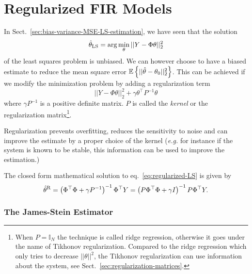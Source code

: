 \chapter{Regularized FIR Models}
\label{chap:regularised-FIR-models}

In Sect.~\ref{sec:bias-variance-MSE-LS-estimation}, we have seen that the solution
\begin{equation*}
  \hat{\theta}_\textrm{LS} = \arg\min_\theta ||Y-\Phi \theta||_2^2
\end{equation*}
of the least squares problem is unbiased. We can however choose to have a biased estimate to reduce the mean square error $\mathbb{E}\left\{||\hat{\theta}-\theta_0||_2^2\right\}$. This can be achieved if we modify the minimization problem by adding a regularization term
\begin{equation}
  \label{eq:regularized-LS}
  ||Y-\Phi \theta||_2^2 + \gamma \theta^\top P^{-1}\theta
\end{equation}
where $\gamma P^{-1}$ is a positive definite matrix. $P$ is called the \emph{kernel} or the regularization matrix\footnote{When $P=\mathbb{I}_N$ the technique is called ridge regression, otherwise it goes under the name of Tikhonov regularization. Compared to the ridge regression which only tries to decrease $||\theta||^2$, the Tikhonov regularization can use information about the system, see Sect.~\ref{sec:regularization-matrices}.}.

Regularization prevents overfitting, reduces the sensitivity to noise and can improve the estimate by a proper choice of the kernel (\textit{e.g.} for instance if the system is known to be stable, this information can be used to improve the estimation.)


The closed form mathematical solution to eq.~\eqref{eq:regularized-LS} is given by
\begin{equation}
  \label{eq:regularized-LS-solution}
  \hat{\theta}^\textrm{R} = \left(\Phi^\top\Phi + \gamma P^{-1}\right)^{-1}\Phi^\top Y = \left(P\Phi^\top\Phi + \gamma I \right)^{-1}P\Phi^\top Y.
\end{equation}

\subsection{The James-Stein Estimator}
\label{sec:james-stein-estimator}

